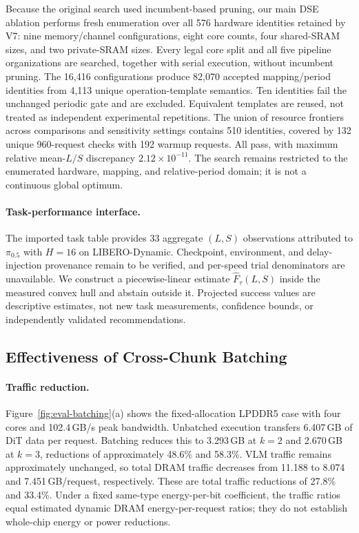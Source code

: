 Because the original search used incumbent-based pruning, our main DSE
ablation performs fresh enumeration over all 576 hardware identities retained
by V7: nine memory/channel configurations, eight core counts, four shared-SRAM
sizes, and two private-SRAM sizes. Every legal core split and all five pipeline
organizations are searched, together with serial execution, without
incumbent pruning. The 16,416 configurations produce 82,070 accepted
mapping/period identities from 4,113 unique operation-template semantics.
Ten identities fail the unchanged periodic gate and are excluded. Equivalent
templates are reused, not treated as independent experimental repetitions.
The union of resource frontiers across comparisons and sensitivity settings
contains 510 identities, covered by 132 unique 960-request checks with
192 warmup requests. All pass, with maximum relative mean-$L/S$ discrepancy
$2.12\times10^{-11}$. The search remains restricted to the enumerated hardware,
mapping, and relative-period domain; it is not a continuous global optimum.

\paragraph{Task-performance interface.}
The imported task table provides 33 aggregate $(L,S)$ observations attributed
to $\pi_{0.5}$ with $H=16$ on LIBERO-Dynamic. Checkpoint, environment, and
delay-injection provenance remain to be verified, and per-speed trial
denominators are unavailable. We construct a piecewise-linear estimate
$\widehat{F}_{\tau}(L,S)$ inside the measured convex hull and abstain outside
it. Projected success values are descriptive estimates, not new task
measurements, confidence bounds, or independently validated recommendations.

\subsection{Effectiveness of Cross-Chunk Batching}
\label{sec:eval-batching}

\paragraph{Traffic reduction.}
Figure~\ref{fig:eval-batching}(a) shows the fixed-allocation LPDDR5 case with
four cores and 102.4\,GB/s peak bandwidth. Unbatched execution transfers
6.407\,GB of DiT data per request. Batching reduces this to 3.293\,GB at $k=2$
and 2.670\,GB at $k=3$, reductions of approximately 48.6\% and 58.3\%.
VLM traffic remains approximately unchanged, so total DRAM traffic decreases
from 11.188 to 8.074 and 7.451\,GB/request, respectively. These are total
traffic reductions of 27.8\% and 33.4\%. Under a fixed same-type energy-per-bit
coefficient, the traffic ratios equal estimated dynamic DRAM energy-per-request
ratios; they do not establish whole-chip energy or power reductions.

